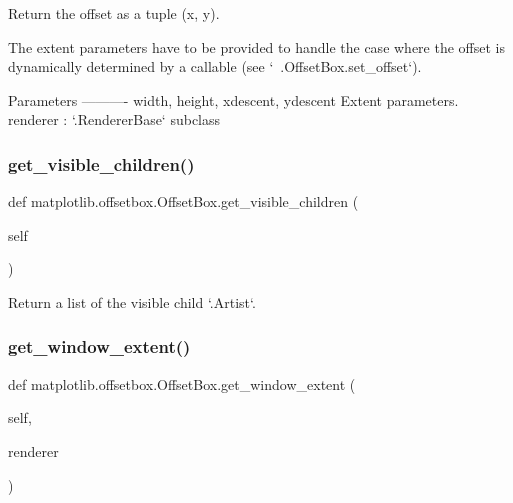 \begin{DoxyVerb}Return the offset as a tuple (x, y).

The extent parameters have to be provided to handle the case where the
offset is dynamically determined by a callable (see
`~.OffsetBox.set_offset`).

Parameters
----------
width, height, xdescent, ydescent
    Extent parameters.
renderer : `.RendererBase` subclass\end{DoxyVerb}
 \mbox{\label{classmatplotlib_1_1offsetbox_1_1OffsetBox_a55c93ea855074d38ad3c0dba9e1896c2}} 
\subsubsection{\texorpdfstring{get\+\_\+visible\+\_\+children()}{get\_visible\_children()}}
{\footnotesize\ttfamily def matplotlib.\+offsetbox.\+Offset\+Box.\+get\+\_\+visible\+\_\+children (\begin{DoxyParamCaption}\item[{}]{self }\end{DoxyParamCaption})}

\begin{DoxyVerb}Return a list of the visible child `.Artist`\s.\end{DoxyVerb}
 \mbox{\label{classmatplotlib_1_1offsetbox_1_1OffsetBox_a1bebc3c91935b8958879d7d423f6ce5a}} 
\subsubsection{\texorpdfstring{get\+\_\+window\+\_\+extent()}{get\_window\_extent()}}
{\footnotesize\ttfamily def matplotlib.\+offsetbox.\+Offset\+Box.\+get\+\_\+window\+\_\+extent (\begin{DoxyParamCaption}\item[{}]{self,  }\item[{}]{renderer }\end{DoxyParamCaption})}

